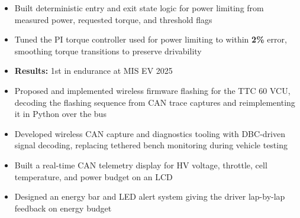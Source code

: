 \documentclass[10pt,letterpaper]{article}
\begin{document}
\entryspace

\orgline{\spartanracing}
\begin{itemize}
  \item Built deterministic entry and exit state logic for power limiting from measured power, requested torque, and threshold flags
  \item Tuned the PI torque controller used for power limiting to within \textbf{2\%} error, smoothing torque transitions to preserve drivability
  \item \textbf{Results:} 1st in endurance at MIS EV 2025
\end{itemize}


\begin{itemize}
  \item Proposed and implemented wireless firmware flashing for the TTC 60 VCU, decoding the flashing sequence from CAN trace captures and reimplementing it in Python over the bus
  \item Developed wireless CAN capture and diagnostics tooling with DBC-driven signal decoding, replacing tethered bench monitoring during vehicle testing
\end{itemize}

\entryspace

\orgline{\spartanracing}
\begin{itemize}
  \item Built a real-time CAN telemetry display for HV voltage, throttle, cell temperature, and power budget on an LCD
  \item Designed an energy bar and LED alert system giving the driver lap-by-lap feedback on energy budget
\end{itemize}
\end{document}

